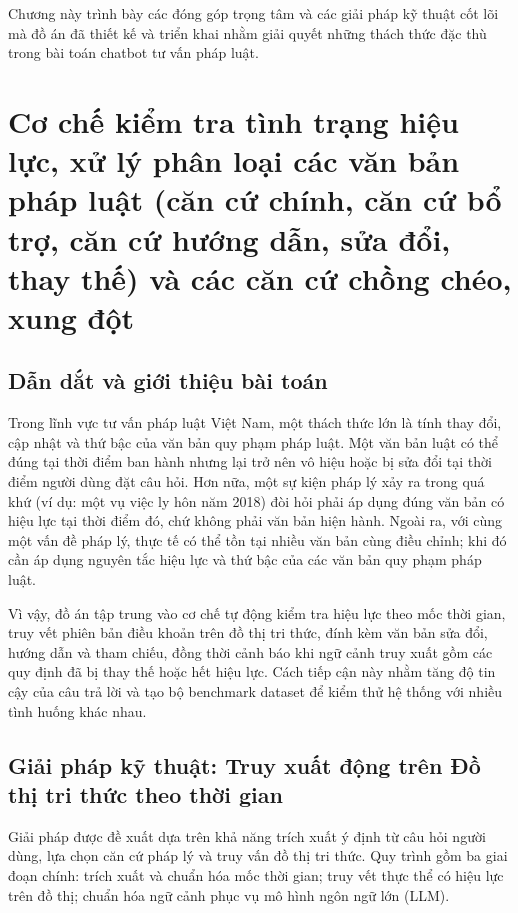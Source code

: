 \documentclass[../DoAn.tex]{subfiles}
\begin{document}
\label{chapter:5}
Chương này trình bày các đóng góp trọng tâm và các giải pháp kỹ thuật cốt lõi mà đồ án đã thiết kế và triển khai nhằm giải quyết những thách thức đặc thù trong bài toán chatbot tư vấn pháp luật.
\section{Cơ chế kiểm tra tình trạng hiệu lực, xử lý phân loại các văn bản pháp luật (căn cứ chính, căn cứ bổ trợ, căn cứ hướng dẫn, sửa đổi, thay thế) và các căn cứ chồng chéo, xung đột}
\label{section:5.1}

\subsection{Dẫn dắt và giới thiệu bài toán}
\label{subsection:5.1.1}

Trong lĩnh vực tư vấn pháp luật Việt Nam, một thách thức lớn là tính thay đổi, cập nhật và thứ bậc của văn bản quy phạm pháp luật. Một văn bản luật có thể đúng tại thời điểm ban hành nhưng lại trở nên vô hiệu hoặc bị sửa đổi tại thời điểm người dùng đặt câu hỏi. Hơn nữa, một sự kiện pháp lý xảy ra trong quá khứ (ví dụ: một vụ việc ly hôn năm 2018) đòi hỏi phải áp dụng đúng văn bản có hiệu lực tại thời điểm đó, chứ không phải văn bản hiện hành. Ngoài ra, với cùng một vấn đề pháp lý, thực tế có thể tồn tại nhiều văn bản cùng điều chỉnh; khi đó cần áp dụng nguyên tắc hiệu lực và thứ bậc của các văn bản quy phạm pháp luật.

Vì vậy, đồ án tập trung vào cơ chế tự động kiểm tra hiệu lực theo mốc thời gian, truy vết phiên bản điều khoản trên đồ thị tri thức, đính kèm văn bản sửa đổi, hướng dẫn và tham chiếu, đồng thời cảnh báo khi ngữ cảnh truy xuất gồm các quy định đã bị thay thế hoặc hết hiệu lực. Cách tiếp cận này nhằm tăng độ tin cậy của câu trả lời và tạo bộ benchmark dataset để kiểm thử hệ thống với nhiều tình huống khác nhau.

\subsection{Giải pháp kỹ thuật: Truy xuất động trên Đồ thị tri thức theo thời gian}
\label{subsection:5.1.2}

Giải pháp được đề xuất dựa trên khả năng trích xuất ý định từ câu hỏi người dùng, lựa chọn căn cứ pháp lý và truy vấn đồ thị tri thức. Quy trình gồm ba giai đoạn chính: trích xuất và chuẩn hóa mốc thời gian; truy vết thực thể có hiệu lực trên đồ thị; chuẩn hóa ngữ cảnh phục vụ mô hình ngôn ngữ lớn (LLM).
\end{document}
